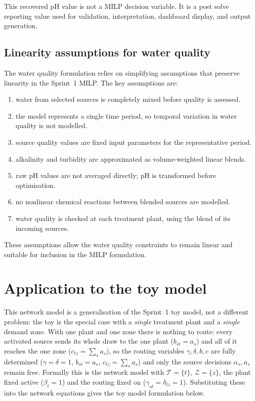 \documentclass[10pt]{article}
\begin{document}
This recovered $\mathrm{pH}$ value is not a MILP decision variable. It is a post
solve reporting value used for validation, interpretation, dashboard display,
and output generation.

\subsection{Linearity assumptions for water quality}

The water quality formulation relies on simplifying assumptions that preserve
linearity in the Sprint~1 MILP. The key assumptions are:
\begin{enumerate}[label=(\roman*), align=left, widest=viii]
    \item water from selected sources is completely mixed before quality is assessed.
    \item the model represents a single time period, so temporal variation in water quality is not modelled.
    \item source quality values are fixed input parameters for the representative period.
    \item alkalinity and turbidity are approximated as volume-weighted linear blends.
    \item raw $\mathrm{pH}$ values are not averaged directly; $\mathrm{pH}$ is transformed before optimisation.
    \item no nonlinear chemical reactions between blended sources are modelled.
    \item water quality is checked at each treatment plant, using the blend of its incoming sources.
\end{enumerate}

These assumptions allow the water quality constraints to remain linear and
suitable for inclusion in the MILP formulation.

\section{Application to the toy model}\label{sec:toy}
This network model is a generalisation of the Sprint~1 toy model, not a different problem: the toy is
the special case with a \emph{single} treatment plant and a \emph{single} demand zone. With
one plant and one zone there is nothing to route: every activated source sends its whole
draw to the one plant ($b_{st}=a_s$) and all of it reaches the one zone
($c_{tz}=\sum_s a_s$), so the routing variables $\gamma,\delta,b,c$ are fully determined
($\gamma=\delta=1$, $b_{st}=a_s$, $c_{tz}=\sum_s a_s$) and only the source decisions
$\alpha_s,a_s$ remain free. Formally this is the network model with
$\mathcal{T}=\{t\}$, $\mathcal{Z}=\{z\}$, the plant fixed active ($\beta_t=1$) and the routing fixed on ($\gamma_{st}=\delta_{tz}=1$). Substituting these into the network equations gives the toy model formulation below.
\end{document}
